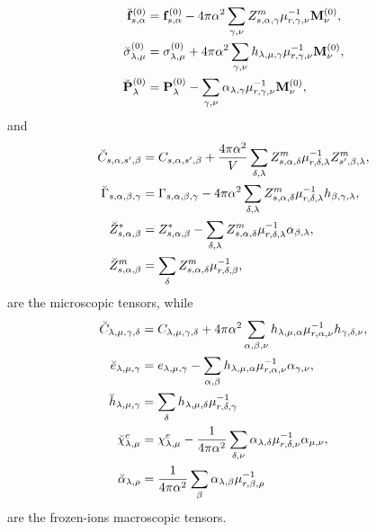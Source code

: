 \documentclass[12pt,a4paper]{article}
\begin{document}
{\begin{align}
\breve {\bf f}^{(0)}_{s,\alpha}&= {\bf f}^{(0)}_{s,\alpha} - 4 \pi
\alpha^2
\sum_{\gamma,\nu}
Z^m_{s,\alpha,\gamma} \mu^{-1}_{r,\gamma,\nu} {\bf M}^{(0)}_\nu, \\
\breve \sigma^{(0)}_{\lambda,\mu}&= \sigma^{(0)}_{\lambda,\mu}
+4 \pi \alpha^2 \sum_{\gamma,\nu} h_{\lambda,\mu,\gamma} \mu^{-1}_{r,\gamma,\nu} 
{\bf M}^{(0)}_\nu, \\
\breve {\bf P}^{(0)}_\lambda&= {\bf P}^{(0)}_\lambda -
\sum_{\gamma,\nu} \alpha_{\lambda,\gamma} \mu^{-1}_{r,\gamma,\nu} 
{\bf M}^{(0)}_\nu, 
\end{align}
and
\begin{align}
\breve C_{s,\alpha,s',\beta} &= C_{s,\alpha,s',\beta}+
{4 \pi \alpha^2 \over V}  \sum_{\delta,\lambda} Z^m_{s,\alpha,\delta}
\mu^{-1}_{r,\delta,\lambda}Z^m_{s',\beta,\lambda},\\
\breve \Gamma_{s,\alpha,\beta,\gamma} &= \Gamma_{s,\alpha,\beta,\gamma}
- 4 \pi \alpha^2 \sum_{\delta,\lambda} Z^m_{s,\alpha,\delta}
\mu^{-1}_{r,\delta,\lambda} h_{\beta,\gamma,\lambda}, \\
\breve Z^*_{s,\alpha,\beta} &= Z^*_{s,\alpha,\beta}
-\sum_{\delta,\lambda} Z^m_{s,\alpha,\delta} 
\mu^{-1}_{r,\delta,\lambda} \alpha_{\beta,\lambda}, \\
\breve Z^m_{s,\alpha,\beta} &= \sum_{\delta} Z^m_{s,\alpha,\delta} 
\mu^{-1}_{r,\delta,\beta}, 
\end{align}
are the microscopic tensors, while
\begin{align}
\breve C_{\lambda,\mu,\gamma,\delta} &=
C_{\lambda,\mu,\gamma,\delta} + 4 \pi \alpha^2 \sum_{\alpha,\beta,\nu}
h_{\lambda,\mu,\alpha} \mu^{-1}_{r,\alpha,\nu} 
h_{\gamma,\delta,\nu}, \\
\breve e_{\lambda,\mu,\gamma}&= e_{\lambda,\mu,\gamma}
-\sum_{\alpha,\beta} h_{\lambda,\mu,\alpha} \mu^{-1}_{r,\alpha,\nu}
\alpha_{\gamma,\nu}, \\
\breve h_{\lambda,\mu,\gamma}&= \sum_\delta h_{\lambda,\mu,\delta}
\mu^{-1}_{r,\delta,\gamma} \\
\breve \chi^e_{\lambda,\mu}&= \chi^e_{\lambda,\mu}
-{1\over 4 \pi \alpha^2} \sum_{\delta,\nu} \alpha_{\lambda,\delta} 
\mu^{-1}_{r,\delta,\nu} \alpha_{\mu,\nu}, \\
\breve \alpha_{\lambda,\rho} &= {1\over 4 \pi \alpha^2}
\sum_\beta \alpha_{\lambda,\beta}
\mu^{-1}_{r,\beta,\rho}
\end{align}
are the frozen-ions macroscopic tensors.
}
\\
\newpage
\end{document}
